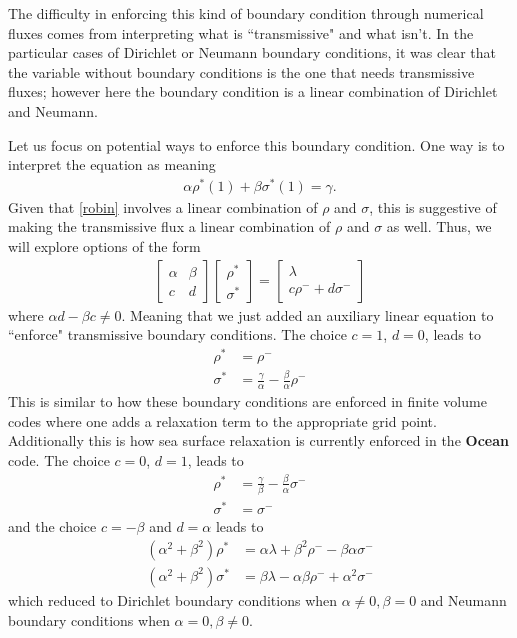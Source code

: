\documentclass{report}
\numberwithin{equation}{section}
\begin{document}
The difficulty in enforcing this kind of boundary condition through numerical fluxes comes from interpreting what is ``transmissive" and what isn't. In the particular cases of Dirichlet or Neumann boundary conditions, it was clear that the variable without boundary conditions is the one that needs transmissive fluxes; however here the boundary condition is a linear combination of Dirichlet and Neumann. 

Let us focus on potential ways to enforce this boundary condition. One way is to interpret the equation as meaning 
\begin{align}
\label{robin}
    \alpha \rho^*(1) + \beta \sigma^*(1) = \gamma.
\end{align}
Given that \ref{robin} involves a linear combination of $\rho$ and $\sigma$, this is suggestive of making the transmissive flux a linear combination of $\rho$ and $\sigma$ as well. Thus, we will explore options of the form
\begin{align}
\begin{bmatrix}
\alpha & \beta \\
c & d 
\end{bmatrix}
\begin{bmatrix}
\rho^* \\
\sigma^*
\end{bmatrix}
= 
\begin{bmatrix}
\lambda \\
c \rho^- + d \sigma^-
\end{bmatrix}
\end{align}
where $\alpha d - \beta c \neq 0$. Meaning that we just added an auxiliary linear equation to ``enforce" transmissive boundary conditions.  
The choice $c=1$, $d = 0$, leads to
\begin{align}
    \rho^* &= \rho^- \\
    \sigma^* &= \frac{\gamma}{\alpha} - \frac{\beta}{\alpha} \rho^- 
\end{align}
This is similar to how these boundary conditions are enforced in finite volume codes where one adds a relaxation term to the appropriate grid point. Additionally this is how sea surface relaxation is currently enforced in the \textbf{Ocean} code. 
The choice $c = 0$, $d = 1$, leads to 
\begin{align}
    \rho^* &= \frac{\gamma}{\beta} - \frac{\beta}{\alpha} \sigma^- \\
    \sigma^* &= \sigma^- 
\end{align}
and the choice $c = -\beta$ and $d = \alpha$ leads to 
\begin{align}
(\alpha^2 + \beta^2) \rho^* &= \alpha \lambda + \beta^2 \rho^- - \beta \alpha \sigma^- \\
(\alpha^2 + \beta^2) \sigma^* &= \beta \lambda - \alpha \beta \rho^- + \alpha^2 \sigma^- 
\end{align}
which reduced to Dirichlet boundary conditions when $\alpha \neq 0, \beta = 0$ and Neumann boundary conditions when $\alpha = 0, \beta \neq 0$. 
\end{document}
